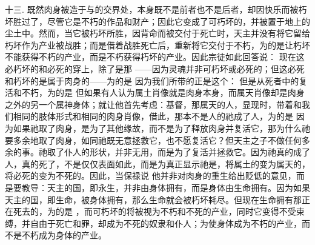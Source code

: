 十三. 既然肉身被造于与的交界处，本身既不是前者也不是后者，却因快乐而被朽坏胜过了，尽管它是不朽的作品和财产；因此它变成了可朽坏的，并被置于地上的尘土中。然而，当它被朽坏所胜，因背命而被交付于死亡时，天主并没有将它留给朽坏作为产业被战胜；而是借着战胜死亡后，重新将它交付于不朽，为的是让朽坏不能获得不朽的产业，而是不朽获得朽坏的产业。因此宗徒如此回答说： 现在这必朽坏的和必死的穿上，除了是那 ——因为灵魂并非可朽坏或必死的；但这必死和朽坏的是属于肉身的——为的是 因为我们所带的正是这个： 但是从死者中的复活和不朽，为的是 但如果有人认为属土肖像就是肉身本身，而属天肖像却是肉身之外的另一个属神身体；就让他首先考虑：基督，那属天的人，显现时，带着和我们相同的肢体形式和相同的肉身肖像，借此，那本不是人的祂成了人，为的是 因为如果祂取了肉身，是为了其他缘故，而不是为了释放肉身并复活它，那为什么祂要多余地取了肉身，如同祂既无意拯救它，也不愿复活它？但天主之子不做任何多余的事。祂取了仆人的形状，并非无用，而是为了复活并拯救它。因为祂真的成了人，真的死了，不是仅仅表面如此，而是为真正显示祂是，将属土的变为属天的，将必死的变为不死的。因此，当保禄说 他并非对肉身的重生给出贬低的意见，而是要教导：天主的国，即永生，并非由身体拥有，而是身体由生命拥有。因为如果天主的国，即生命，被身体拥有，那么生命就会被朽坏耗尽。但现在生命拥有那正在死去的，为的是 ，而可朽坏的将被视为不朽和不死的产业，同时它变得不受束缚，并自由于死亡和罪，却成为不死的奴隶和仆人；为使身体成为不朽的产业，而不是不朽成为身体的产业。\par

